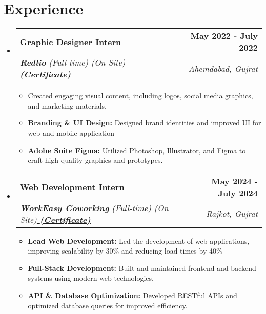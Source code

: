 \documentclass[letterpaper,11pt]{article}
\makeatletter
\newcommand{\resumeItem}[1]{
  \item\small{
	{#1 \vspace{-2pt}}
  }
}
\newcommand{\resumeSubheading}[4]{
  \vspace{-2pt}\item
	\begin{tabular*}{1.0\textwidth}[t]{l@{\extracolsep{\fill}}r}
  	\textbf{#1} & \textbf{\small #2} \\
  	\textit{\small#3} & \textit{\small #4} \\
	\end{tabular*}\vspace{-7pt}
}
\newcommand{\resumeSubHeadingListStart}{\begin{itemize}[leftmargin=0.0in, label={}]}
\newcommand{\resumeSubHeadingListEnd}{\end{itemize}}
\newcommand{\resumeItemListStart}{\begin{itemize}}
\newcommand{\resumeItemListEnd}{\end{itemize}\vspace{-5pt}}
\makeatother
\begin{document}
\section{Experience}
  \resumeSubHeadingListStart
	\resumeSubheading
  	{Graphic Designer Intern}{May 2022 - July 2022}
  	{\textbf{Redlio} (Full-time) (On Site)\href{https://drive.google.com/file/d/1SWdW-F-6Hgqeu0veqRsAaCgNv92LNXJo/view?usp=sharing}{\textbf{ (Certificate)}}}{Ahemdabad, Gujrat}
  	\resumeItemListStart
    	\resumeItem{Created engaging visual content, including logos, social media graphics, and marketing materials. }
    	\resumeItem{\textbf{Branding \& UI Design: }Designed brand identities and improved UI for web and mobile application }
            \resumeItem{\textbf{Adobe Suite Figma: }Utilized Photoshop, Illustrator, and Figma to craft high-quality graphics and prototypes. }
	\resumeItemListEnd
 \vspace{2pt}
        \resumeSubheading
  	{Web Development Intern}{May 2024 - July 2024}
  	{\textbf{WorkEasy Coworking} (Full-time) (On Site)\href{https://drive.google.com/file/d/1pTSCTfcFmuF_aIUC0LycB4etyXLbGTCl/view?usp=sharing}{\textbf{ (Certificate)}}}{Rajkot, Gujrat}
  	\resumeItemListStart
    	\resumeItem{\textbf{Lead Web Development:} Led the development of web applications, improving scalability by 30\% and reducing load times by 40\%}
    	\resumeItem{\textbf{Full-Stack Development: }Built and maintained frontend and backend systems using modern web technologies. }
            \resumeItem{\textbf{API \& Database Optimization:} Developed RESTful APIs and optimized database queries for improved efficiency. }
	\resumeItemListEnd
    
  \resumeSubHeadingListEnd

  
\end{document}
